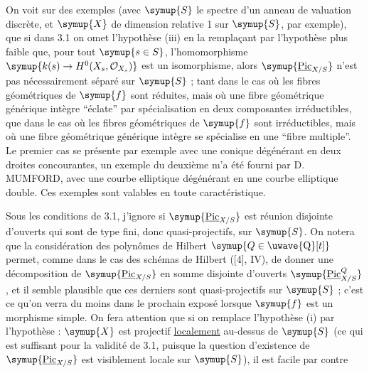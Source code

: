  On voit sur des exemples (avec $\symup{S}$ le spectre d'un
anneau de valuation discrète, et $\symup{X}$ de dimension relative 1 sur $\symup{S}$, par
exemple), que si dans 3.1 on omet l'hypothèse (iii) en la remplaçant par
l'hypothèse plus faible que, pour tout $\symup{s\in S}$, l'homomorphisme
$\symup{k(s)\to H^0(X_s,\mathcal O_{X_s})}$ est un isomorphisme, alors $\symup{\underline{\operatorname{Pic}}_{X/S}}$ n'est pas nécessairement
séparé sur $\symup{S}$ ; tant dans le cas où les fibres géométriques de $\symup{f}$ sont
réduites, mais où une fibre géométrique générique intègre ``éclate'' par
spécialisation en deux composantes irréductibles, que dans le cas où les fibres
géométriques de $\symup{f}$ sont irréductibles, mais où une fibre géométrique générique
intègre se spécialise en une ``fibre multiple''. Le premier cas se présente par
exemple avec une conique dégénérant en deux droites concourantes, un exemple
du deuxième m'a été fourni par D. MUMFORD, avec une courbe elliptique dégénérant
en une courbe elliptique double. Ces exemples sont valables en toute
caractéristique.

 Sous les conditions de 3.1, j'ignore si
$\symup{\underline{\operatorname{Pic}}_{X/S}}$ est réunion disjointe d'ouverts qui sont de type
fini, donc quasi-projectifs, sur $\symup{S}$. On notera que la considération des polynômes
de Hilbert $\symup{Q\in\text{\uwave{Q}}[t]}$ permet, comme dans le cas des schémas de Hilbert
([4], IV), de donner une décomposition de $\symup{\underline{\operatorname{Pic}}_{X/S}}$ en somme
disjointe d'ouverts $\symup{\underline{\operatorname{Pic}}^{Q}_{X/S}}$, et il semble plausible que
ces derniers sont quasi-projectifs sur $\symup{S}$ ; c'est ce qu'on verra du moins dans
le prochain exposé lorsque $\symup{f}$ est un morphisme simple. On fera attention que
si on remplace l'hypothèse (i) par l'hypothèse : $\symup{X}$ est projectif \uline{localement}
au-dessus de $\symup{S}$ (ce qui est suffisant pour la validité de 3.1, puisque la
question d'existence de $\symup{\underline{\operatorname{Pic}}_{X/S}}$ est visiblement locale sur
$\symup{S}$), il est facile par contre

